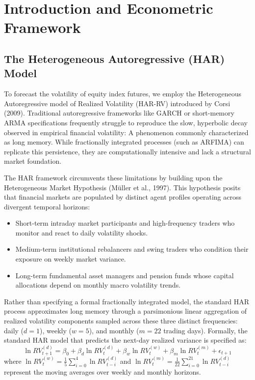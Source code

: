 \documentclass{report}
\begin{document}
\chapter{Introduction and Econometric Framework}

\section{The Heterogeneous Autoregressive (HAR) Model}
To forecast the volatility of equity index futures, we employ the Heterogeneous Autoregressive model of Realized Volatility (HAR-RV) introduced by Corsi (2009). Traditional autoregressive frameworks like GARCH or short-memory ARMA specifications frequently struggle to reproduce the slow, hyperbolic decay observed in empirical financial volatility: A phenomenon commonly characterized as long memory. While fractionally integrated processes (such as ARFIMA) can replicate this persistence, they are computationally intensive and lack a structural market foundation.

\vspace{1em}

The HAR framework circumvents these limitations by building upon the Heterogeneous Market Hypothesis (Müller et al., 1997). This hypothesis posits that financial markets are populated by distinct agent profiles operating across divergent temporal horizons:
\begin{itemize}
    \item Short-term intraday market participants and high-frequency traders who monitor and react to daily volatility shocks.
    \item Medium-term institutional rebalancers and swing traders who condition their exposure on weekly market variance.
    \item Long-term fundamental asset managers and pension funds whose capital allocations depend on monthly macro volatility trends.
\end{itemize}


Rather than specifying a formal fractionally integrated model, the standard HAR process approximates long memory through a parsimonious linear aggregation of realized volatility components sampled across these three distinct frequencies: daily ($d=1$), weekly ($w=5$), and monthly ($m=22$ trading days). Formally, the standard HAR model that predicts the next-day realized variance is specified as: 
\begin{equation}
\ln RV_{t+1}^{(d)} = \beta_0 + \beta_d \ln RV_{t}^{(d)} + \beta_w \ln RV_{t}^{(w)} + \beta_m \ln RV_{t}^{(m)} + \epsilon_{t+1}
\end{equation}
where $\ln RV_{t}^{(w)} = \frac{1}{5}\sum_{i=0}^{4}\ln RV_{t-i}^{(d)}$ and $\ln RV_{t}^{(m)} = \frac{1}{22}\sum_{i=0}^{21}\ln RV_{t-i}^{(d)}$ represent the moving averages over weekly and monthly horizons. 
\end{document}
